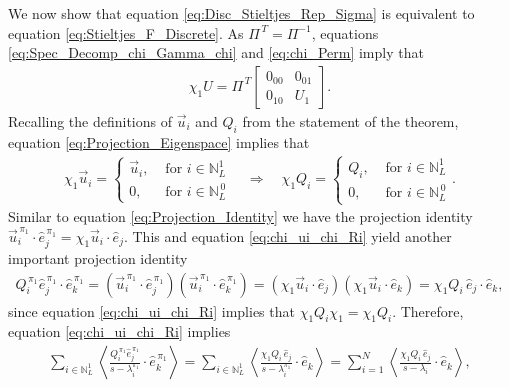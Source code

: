 \documentclass{cmslatex}
\begin{document}
We now show that equation \eqref{eq:Disc_Stieltjes_Rep_Sigma} is
equivalent to equation \eqref{eq:Stieltjes_F_Discrete}. As
$\Pi^{\,T}=\Pi^{-1}$, equations \eqref{eq:Spec_Decomp_chi_Gamma_chi} and 
\eqref{eq:chi_Perm} imply that
%
\begin{align}\label{eq:Projection_Eigenspace}
  \chi_1U=\Pi^{\,T}\left[
  \begin{array}{ccc}
    0_{00}&0_{01}\\
    0_{10}&U_1  
    \end{array}
\right].
\end{align}
%
Recalling the definitions of $\vec{u}_i$ and $Q_i$ from the
statement of the theorem, equation \eqref{eq:Projection_Eigenspace}
implies that 
%
\begin{align}\label{eq:chi_ui_chi_Ri}
  \chi_1\vec{u}_i=
  \begin{cases}
  \vec{u}_i, &\text{ for } i\in\mathbb{N}_L^1  \\
  0,        &\text{ for } i\in\mathbb{N}_L^{\,0}
  \end{cases}
  \quad \Rightarrow \quad
   \chi_1Q_i=
  \begin{cases}
  Q_i, &\text{ for } i\in\mathbb{N}_L^1  \\
  0,  &\text{ for } i\in\mathbb{N}_L^{\,0} 
  \end{cases}.
\end{align}
%
Similar to equation \eqref{eq:Projection_Identity} we have the
projection identity
$\vec{u}_i^{\,\pi_1}\cdot\hat{e}_j^{\,\pi_1}=\chi_1\vec{u}_i\cdot\hat{e}_j$. This and
equation \eqref{eq:chi_ui_chi_Ri} yield another important projection
identity 
%
\begin{align}
  Q_i^{\,\pi_1}\hat{e}_j^{\,\pi_1}\cdot\hat{e}_k^{\,\pi_1}
  =
   (\vec{u}_i^{\,\pi_1}\cdot\hat{e}_j^{\,\pi_1})(\vec{u}_i^{\,\pi_1}\cdot\hat{e}_k^{\,\pi_1}) 
  =(\chi_1\vec{u}_i\cdot\hat{e}_j)(\chi_1\vec{u}_i\cdot\hat{e}_k)
  =\chi_1Q_i\,\hat{e}_j\cdot\hat{e}_k,
\end{align}
%
since equation \eqref{eq:chi_ui_chi_Ri}
implies that $\chi_1Q_i\chi_1=\chi_1Q_i$. Therefore, equation
\eqref{eq:chi_ui_chi_Ri} implies 
%
\begin{align}
 \sum_{i\in\mathbb{N}_L^1}\left\langle
          \frac{Q_i^{\,\pi_1}\hat{e}_j^{\,\pi_1}}{s-\lambda_i^{\pi_1}}\cdot\hat{e}_k^{\,\pi_1}
          \right\rangle 
 =
 \sum_{i\in\mathbb{N}_L^1}\left\langle
          \frac{\chi_1Q_i\,\hat{e}_j}{s-\lambda_i^{\pi_1}}\cdot\hat{e}_k
          \right\rangle 
          =
 \sum_{i=1}^N\left\langle
          \frac{\chi_1Q_i\,\hat{e}_j}{s-\lambda_i}\cdot\hat{e}_k
          \right\rangle ,
\end{align}
\end{document}
